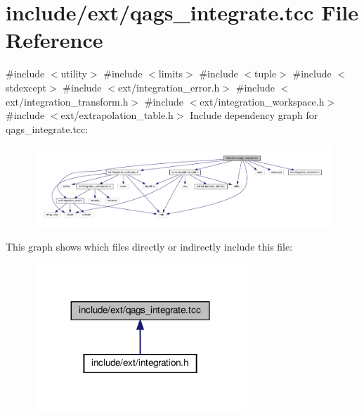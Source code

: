 \hypertarget{qags__integrate_8tcc}{}\section{include/ext/qags\+\_\+integrate.tcc File Reference}
\label{qags__integrate_8tcc}
{\ttfamily \#include $<$utility$>$}\newline
{\ttfamily \#include $<$limits$>$}\newline
{\ttfamily \#include $<$tuple$>$}\newline
{\ttfamily \#include $<$stdexcept$>$}\newline
{\ttfamily \#include $<$ext/integration\+\_\+error.\+h$>$}\newline
{\ttfamily \#include $<$ext/integration\+\_\+transform.\+h$>$}\newline
{\ttfamily \#include $<$ext/integration\+\_\+workspace.\+h$>$}\newline
{\ttfamily \#include $<$ext/extrapolation\+\_\+table.\+h$>$}\newline
Include dependency graph for qags\+\_\+integrate.\+tcc\+:
\nopagebreak
\begin{figure}[H]
\begin{center}
\leavevmode
\includegraphics[width=350pt]{qags__integrate_8tcc__incl}
\end{center}
\end{figure}
This graph shows which files directly or indirectly include this file\+:
\nopagebreak
\begin{figure}[H]
\begin{center}
\leavevmode
\includegraphics[width=227pt]{qags__integrate_8tcc__dep__incl}
\end{center}
\end{figure}
